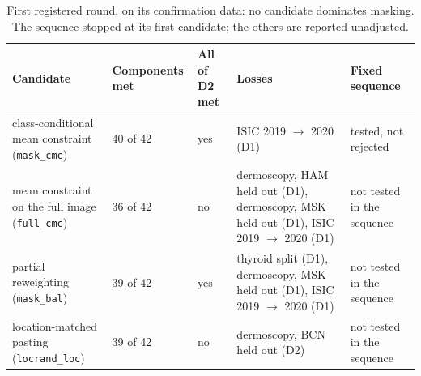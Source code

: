 \begin{table}[H]\centering\scriptsize
\caption{First registered round, on its confirmation data: no candidate dominates masking. The sequence stopped at its first candidate; the others are reported unadjusted.}\label{tab:s17rEight}
\begin{tabular}{p{4.6cm}p{1.6cm}p{1.3cm}p{5.0cm}p{2.6cm}}\toprule
Candidate & Components met & All of D2 met & Losses & Fixed sequence \\\midrule
class-conditional mean constraint (\texttt{mask\_cmc}) & 40 of 42 & yes & ISIC 2019 $\to$ 2020 (D1) & tested, not rejected \\
mean constraint on the full image (\texttt{full\_cmc}) & 36 of 42 & no & dermoscopy, HAM held out (D1), dermoscopy, MSK held out (D1), ISIC 2019 $\to$ 2020 (D1) & not tested in the sequence \\
partial reweighting (\texttt{mask\_bal}) & 39 of 42 & yes & thyroid split (D1), dermoscopy, MSK held out (D1), ISIC 2019 $\to$ 2020 (D1) & not tested in the sequence \\
location-matched pasting (\texttt{locrand\_loc}) & 39 of 42 & no & dermoscopy, BCN held out (D2) & not tested in the sequence \\
\bottomrule\end{tabular}
\end{table}
